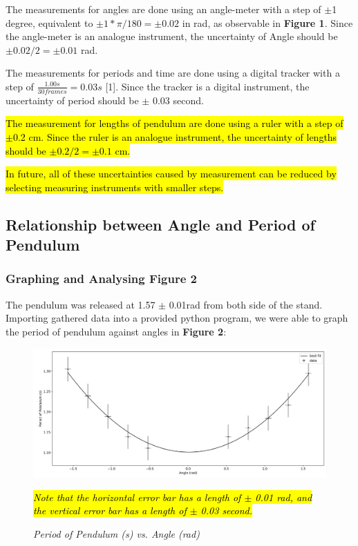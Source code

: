 \documentclass{article}
\begin{document}
The measurements for angles are done using an angle-meter with a step of $\pm$1 degree, equivalent to $\pm 1*\pi/180= \pm0.02$ in rad, as observable in \textbf{Figure 1}. Since the angle-meter is an analogue instrument, the uncertainty of Angle should be $\pm 0.02/2= \pm0.01$ rad.

 The measurements for periods and time are done using a digital tracker with a step of $ \frac{1.00 s}{30 frames}=0.03 s$ [1]. Since the tracker is a digital instrument, the uncertainty of period should be $\pm$ 0.03 second.
 
 \hl{The measurement for lengths of pendulum are done using a ruler with a step of $\pm$0.2 cm. Since the ruler is an analogue instrument, the uncertainty of lengths should be $\pm 0.2/2= \pm0.1$ cm.}
 
 \hl{In future, all of these uncertainties caused by measurement can be reduced by selecting measuring instruments with smaller steps.}


\subsection{Relationship between Angle and Period of Pendulum}

\subsubsection{Graphing and Analysing Figure 2}
The pendulum was released at 1.57 $\pm$ 0.01rad from both side of the stand. Importing gathered data into a provided python program, we were able to graph the period of pendulum against angles in \textbf{Figure 2}:

\begin{figure}[!htb]
	\includegraphics[scale=0.28]{fig_angle.png}
	\caption{\textit{Period of Pendulum (s) vs. Angle (rad)}}
	\center \textit{\hl{ Note that the horizontal error bar has a length of $\pm$ 0.01 rad, and the vertical error bar has a length of $\pm$ 0.03 second.} }

	\label{fig_angle}
\end{figure}
\end{document}
